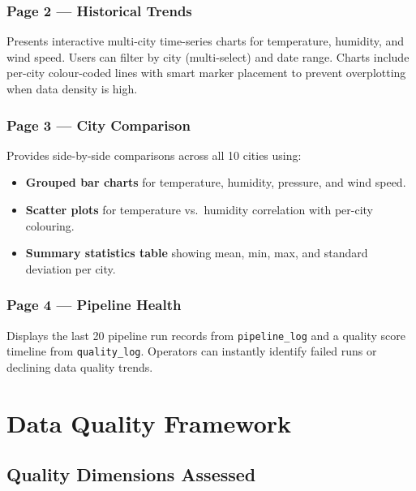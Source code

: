 \documentclass[12pt,a4paper]{report}
\begin{document}
\subsection{Page 2 — Historical Trends}

Presents interactive multi-city time-series charts for temperature, humidity, and wind speed. Users can filter by city (multi-select) and date range. Charts include per-city colour-coded lines with smart marker placement to prevent overplotting when data density is high.



\subsection{Page 3 — City Comparison}

Provides side-by-side comparisons across all 10 cities using:
\begin{itemize}
  \item \textbf{Grouped bar charts} for temperature, humidity, pressure, and wind speed.
  \item \textbf{Scatter plots} for temperature vs.\ humidity correlation with per-city colouring.
  \item \textbf{Summary statistics table} showing mean, min, max, and standard deviation per city.
\end{itemize}



\subsection{Page 4 — Pipeline Health}

Displays the last 20 pipeline run records from \texttt{pipeline\_log} and a quality score timeline from \texttt{quality\_log}. Operators can instantly identify failed runs or declining data quality trends.



\chapter{Data Quality Framework}

\section{Quality Dimensions Assessed}
\end{document}
